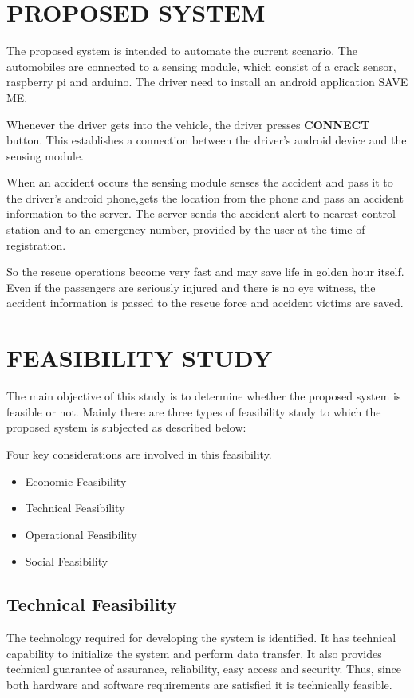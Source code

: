 \documentclass[12pt,a4paper,oneside]{report}
\begin{document}
{\section{PROPOSED SYSTEM}

\par The proposed system is intended to automate the current scenario. The automobiles are connected to a sensing module, which consist of a crack sensor, raspberry pi and arduino. The driver need to install an android application SAVE ME.
\par Whenever the driver gets into the vehicle, the driver presses \textbf{CONNECT} button. This establishes a connection between the driver's android device and the sensing module.
\par When an accident occurs the sensing module senses the accident and pass it to the driver's android phone,gets the location from the phone and pass an accident information to the server. The server sends the accident alert to nearest control station and to an emergency number, provided by the user at the time of registration.
\par So the rescue operations become very fast and may save life in golden hour itself. Even if the passengers are seriously injured and there is no eye witness, the accident information is passed to the rescue force and accident victims are saved.

\section{FEASIBILITY STUDY}
\par The main objective of this study is to determine whether the proposed system is feasible
or not. Mainly there are three types of feasibility study to which the proposed system is subjected
as described below:
\par Four key considerations are involved in this feasibility.
\begin{itemize}
\item Economic Feasibility
\item Technical Feasibility
\item Operational Feasibility
\item Social Feasibility
\end{itemize}
\subsection{Technical Feasibility}
\par The technology required for developing the system is identified. It has technical capability
to initialize the system and perform data transfer. It also provides technical guarantee of assurance,
reliability, easy access and security. Thus, since both hardware and software requirements
are satisfied it is technically feasible.
}
\end{document}
